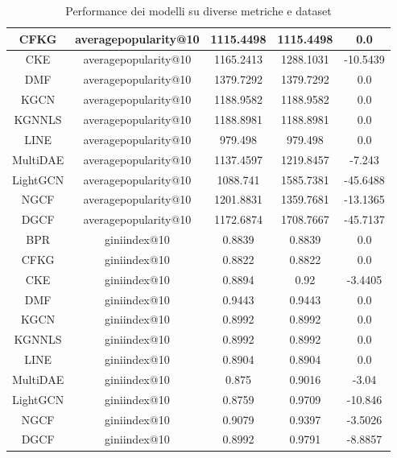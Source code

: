 \begin{table}[H]
{\begin{tabular}{|c|c|c|c|c|}
    CFKG & averagepopularity@10 & 1115.4498 & 1115.4498 & 0.0 \\ \hline
    CKE & averagepopularity@10 & 1165.2413 & 1288.1031 & -10.5439 \\ \hline
    DMF & averagepopularity@10 & 1379.7292 & 1379.7292 & 0.0 \\ \hline
    KGCN & averagepopularity@10 & 1188.9582 & 1188.9582 & 0.0 \\ \hline
    KGNNLS & averagepopularity@10 & 1188.8981 & 1188.8981 & 0.0 \\ \hline
    LINE & averagepopularity@10 & 979.498 & 979.498 & 0.0 \\ \hline
    MultiDAE & averagepopularity@10 & 1137.4597 & 1219.8457 & -7.243 \\ \hline
    LightGCN & averagepopularity@10 & 1088.741 & 1585.7381 & -45.6488 \\ \hline
    NGCF & averagepopularity@10 & 1201.8831 & 1359.7681 & -13.1365 \\ \hline
    DGCF & averagepopularity@10 & 1172.6874 & 1708.7667 & -45.7137 \\ \hline
    BPR & giniindex@10 & 0.8839 & 0.8839 & 0.0 \\ \hline
    CFKG & giniindex@10 & 0.8822 & 0.8822 & 0.0 \\ \hline
    CKE & giniindex@10 & 0.8894 & 0.92 & -3.4405 \\ \hline
    DMF & giniindex@10 & 0.9443 & 0.9443 & 0.0 \\ \hline
    KGCN & giniindex@10 & 0.8992 & 0.8992 & 0.0 \\ \hline
    KGNNLS & giniindex@10 & 0.8992 & 0.8992 & 0.0 \\ \hline
    LINE & giniindex@10 & 0.8904 & 0.8904 & 0.0 \\ \hline
    MultiDAE & giniindex@10 & 0.875 & 0.9016 & -3.04 \\ \hline
    LightGCN & giniindex@10 & 0.8759 & 0.9709 & -10.846 \\ \hline
    NGCF & giniindex@10 & 0.9079 & 0.9397 & -3.5026 \\ \hline
    DGCF & giniindex@10 & 0.8992 & 0.9791 & -8.8857 \\ \hline
\end{tabular}
    }
    \caption{Performance dei modelli su diverse metriche e dataset}
    \end{table}


